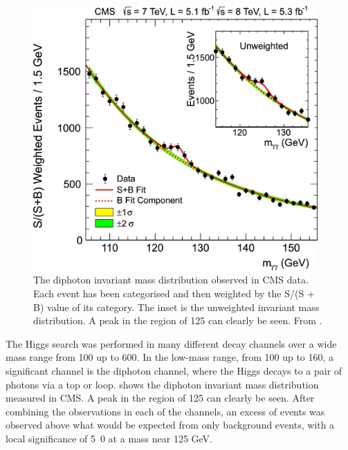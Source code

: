 \begin{figure}[htbp]
  \centering
  \includegraphics[width=0.97\textwidth]{higgs}
  \caption[The diphoton invariant mass distribution observed in CMS data.] {The
diphoton invariant mass distribution observed in CMS data.  Each event has been
categorised and then weighted by the S/(S + B) value of its category. The inset
is the unweighted invariant mass distribution. A peak in the region of
\unit{125}{\GeV} can clearly be seen. From \cite{chatrchyan2012observation}. }
  \label{fig:hgg}
\end{figure}

The Higgs search was performed in many different decay channels over a wide
mass range from 100 up to \unit{600}{\GeV}.
In the low-mass range, from 100 up to \unit{160}{\GeV}, a significant channel is the
diphoton channel, where the Higgs decays to a pair of photons via a top or \PW loop.
 shows the diphoton invariant mass distribution measured in CMS.
A peak in the region of \unit{125}{\GeV} can clearly be seen. 
After combining the observations in each of the channels, an excess of events
was observed above what would be expected from only background events, with a
local signiﬁcance of \unit{5.0}{\sigma} at a mass near 125 GeV.

